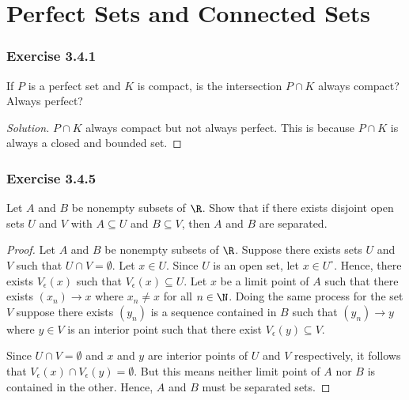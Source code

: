 \section{Perfect Sets and Connected Sets}


\subsubsection{Exercise 3.4.1} If \( P \) is a perfect set and \( K \) is compact, is the intersection \( P \cap K  \) always compact? Always perfect? 
\begin{proof}[Solution]
\( P \cap K \) always compact but not always perfect. This is because \( P \cap K  \) is always a closed and bounded set.
\end{proof}

\subsubsection{Exercise 3.4.5} 
Let \( A  \) and \( B  \) be nonempty subsets of \( \R  \). Show that if there exists disjoint open sets \( U  \) and \( V  \) with \( A \subseteq U  \) and \( B \subseteq V  \), then \( A  \) and \( B  \) are separated.

\begin{proof}
    Let \( A  \) and \( B  \) be nonempty subsets of \( \R  \). Suppose there exists sets \( U \) and \( V  \) such that \( U \cap V = \emptyset \). Let \( x  \in U \). Since \( U \) is an open set, let \( x \in U^{\circ} \). Hence,  there exists \( V_{\epsilon }(x) \) such that \( V_{\epsilon }(x) \subseteq U  \). Let \( x  \) be a limit point of \( A  \) such that there exists \( (x_n) \to x  \) where \( x_n \neq x  \) for all \( n \in \N  \). Doing the same process for the set \( V \) suppose there exists \( (y_n)  \) is a sequence contained in \( B  \) such that \( (y_n) \to y  \) where \( y \in V  \) is an interior point such that there exist \( V_{\epsilon }(y) \subseteq V  \).

    Since \( U \cap V = \emptyset \) and \( x  \) and \( y \) are interior points of \( U \) and \( V  \) respectively, it follows that \( V_{\epsilon }(x) \cap V_{\epsilon }(y) = \emptyset \). But this means neither limit point of \(A \) nor \( B \) is contained in the other. Hence, \( A  \) and \( B  \) must be separated sets.
\end{proof}





